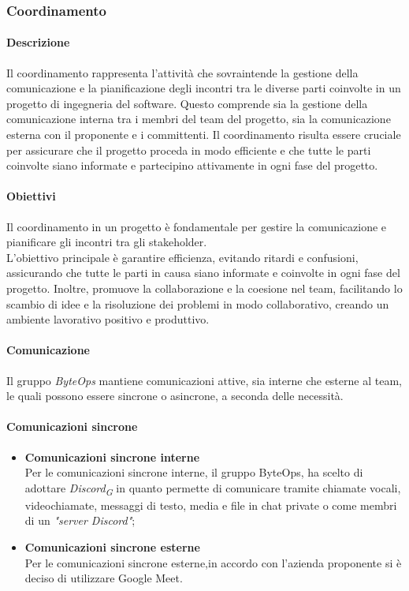 \subsubsection{Coordinamento}

\paragraph{Descrizione}
Il coordinamento rappresenta l'attività che sovraintende la gestione della comunicazione e la pianificazione degli incontri tra le diverse parti coinvolte in un progetto di ingegneria del software. Questo comprende sia la gestione della comunicazione interna tra i membri del team del progetto, sia la comunicazione esterna con il proponente e i committenti. Il coordinamento risulta essere cruciale per assicurare che il progetto proceda in modo efficiente e che tutte le parti coinvolte siano informate e partecipino attivamente in ogni fase del progetto.

\paragraph{Obiettivi}
Il coordinamento in un progetto è fondamentale per gestire la comunicazione e pianificare gli incontri tra gli stakeholder. \\
L'obiettivo principale è garantire efficienza, evitando ritardi e confusioni, assicurando che tutte le parti in causa siano informate e coinvolte in ogni fase del progetto. Inoltre, promuove la collaborazione e la coesione nel team, facilitando lo scambio di idee e la risoluzione dei problemi in modo collaborativo, creando un ambiente lavorativo positivo e produttivo.

\paragraph*{Comunicazione}
Il gruppo \textit{ByteOps} mantiene comunicazioni attive, sia interne che esterne al team, le quali possono essere sincrone o asincrone, a seconda delle necessità.

\paragraph{Comunicazioni sincrone}
\begin{itemize}
  \item \textbf{Comunicazioni sincrone interne} \\
  Per le comunicazioni sincrone interne, il gruppo ByteOps, ha scelto di adottare \textit{Discord}\textsubscript{\textit{G}} in quanto permette di comunicare tramite chiamate vocali, videochiamate, messaggi di testo, media e file in chat private o come membri di un \textit{"server Discord"};

  \item \textbf{Comunicazioni sincrone esterne} \\
  Per le comunicazioni sincrone esterne,in accordo con l'azienda proponente si è deciso di utilizzare Google Meet.
\end{itemize}

